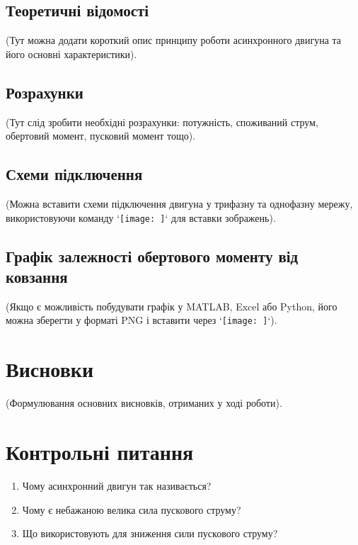 \documentclass[a4paper]{article}
\begin{document}
\subsection*{Теоретичні відомості}
(Тут можна додати короткий опис принципу роботи асинхронного двигуна та його основні характеристики).

\subsection*{Розрахунки}
(Тут слід зробити необхідні розрахунки: потужність, споживаний струм, обертовий момент, пусковий момент тощо).

\subsection*{Схеми підключення}
(Можна вставити схеми підключення двигуна у трифазну та однофазну мережу, використовуючи команду `\texttt{[image: ]}` для вставки зображень).

\subsection*{Графік залежності обертового моменту від ковзання}
(Якщо є можливість побудувати графік у MATLAB, Excel або Python, його можна зберегти у форматі PNG і вставити через `\texttt{[image: ]}`).

\section*{Висновки}
(Формулювання основних висновків, отриманих у ході роботи).

\section*{Контрольні питання}
\begin{enumerate}
    \item Чому асинхронний двигун так називається?
    \item Чому є небажаною велика сила пускового струму?
    \item Що використовують для зниження сили пускового струму?
\end{enumerate}
\end{document}
